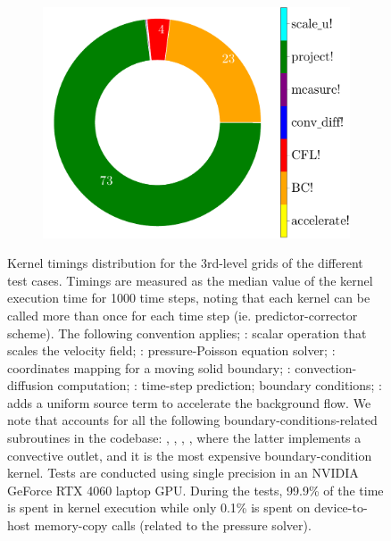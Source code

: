 \documentclass[final,3p,times]{elsarticle}
\begin{document}
\begin{figure}[!t]
\begin{subfigure}[t]{0.33\linewidth}
{      \includegraphics[width=\linewidth]{img/cylinder_profile.pdf}%
    }
  \end{subfigure}
  \caption{Kernel timings distribution for the 3rd-level grids of the different test cases. Timings are measured as the median value of the kernel execution time for 1000 time steps, noting that each kernel can be called more than once for each time step (ie. predictor-corrector scheme). The following convention applies; : scalar operation that scales the velocity field; : pressure-Poisson equation solver; : coordinates mapping for a moving solid boundary; : convection-diffusion computation; : time-step prediction;  boundary conditions; : adds a uniform source term to accelerate the background flow. We note that  accounts for all the following boundary-conditions-related subroutines in the codebase: , , , , where the latter implements a convective outlet, and it is the most expensive boundary-condition kernel. Tests are conducted using single precision in an NVIDIA GeForce RTX 4060 laptop GPU. During the tests, 99.9\% of the time is spent in kernel execution while only 0.1\% is spent on device-to-host memory-copy calls (related to the pressure solver).}
\label{fig:profiling}
\end{figure}
\end{document}
